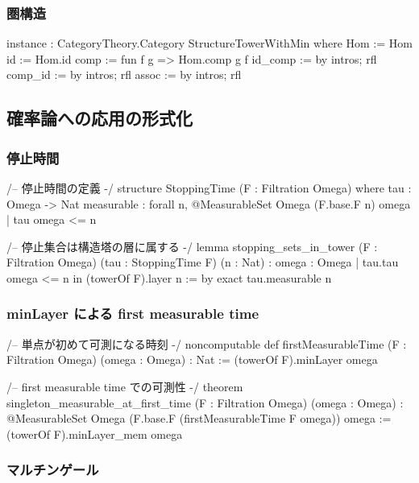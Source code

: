 \documentclass[11pt,a4paper]{article}
\theoremstyle{plain}
\theoremstyle{definition}
\begin{document}
\subsubsection{圏構造}

\begin{leancode}
instance : CategoryTheory.Category StructureTowerWithMin where
  Hom := Hom
  id := Hom.id
  comp := fun f g => Hom.comp g f
  id_comp := by intros; rfl
  comp_id := by intros; rfl
  assoc := by intros; rfl
\end{leancode}

\subsection{確率論への応用の形式化}

\subsubsection{停止時間}

\begin{leancode}
/-- 停止時間の定義 -/
structure StoppingTime (F : Filtration Omega) where
  tau : Omega -> Nat
  measurable : forall n, @MeasurableSet Omega (F.base.F n) {omega | tau omega <= n}

/-- 停止集合は構造塔の層に属する -/
lemma stopping_sets_in_tower (F : Filtration Omega)
    (tau : StoppingTime F) (n : Nat) :
    {omega : Omega | tau.tau omega <= n} in (towerOf F).layer n := by
  exact tau.measurable n
\end{leancode}

\subsubsection{minLayer による first measurable time}

\begin{leancode}
/-- 単点が初めて可測になる時刻 -/
noncomputable def firstMeasurableTime (F : Filtration Omega) (omega : Omega) : Nat :=
  (towerOf F).minLayer {omega}

/-- first measurable time での可測性 -/
theorem singleton_measurable_at_first_time (F : Filtration Omega) (omega : Omega) :
    @MeasurableSet Omega (F.base.F (firstMeasurableTime F omega)) {omega} :=
  (towerOf F).minLayer_mem {omega}
\end{leancode}

\subsubsection{マルチンゲール}
\end{document}
